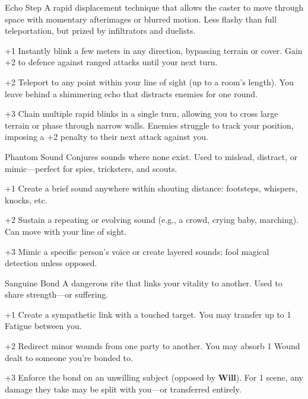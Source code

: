 \begin{WyrdSpell}[Translocation]{Echo Step}
    A rapid displacement technique that allows the caster to move through space with momentary afterimages or blurred motion. Less flashy than full teleportation, but prized by infiltrators and duelists.

    \begin{WyrdSpellBlock}
        \item[+1] Instantly blink a few meters in any direction, bypassing terrain or cover. Gain +2 to defence against ranged attacks until your next turn.
        \item[+2] Teleport to any point within your line of sight (up to a room’s length). You leave behind a shimmering echo that distracts enemies for one round.
        \item[+3] Chain multiple rapid blinks in a single turn, allowing you to cross large terrain or phase through narrow walls. Enemies struggle to track your position, imposing a +2 penalty to their next attack against you.
    \end{WyrdSpellBlock}
\end{WyrdSpell}

\begin{WyrdSpell}[Illusion]{Phantom Sound}
    Conjures sounds where none exist. Used to mislead, distract, or mimic—perfect for spies, tricksters, and scouts.

    \begin{WyrdSpellBlock}
        \item[+1] Create a brief sound anywhere within shouting distance: footsteps, whispers, knocks, etc.
        \item[+2] Sustain a repeating or evolving sound (e.g., a crowd, crying baby, marching). Can move with your line of sight.
        \item[+3] Mimic a specific person’s voice or create layered sounds; fool magical detection unless opposed.
    \end{WyrdSpellBlock}
\end{WyrdSpell}

\begin{WyrdSpell}[Blood]{Sanguine Bond}
    A dangerous rite that links your vitality to another. Used to share strength—or suffering.

    \begin{WyrdSpellBlock}
        \item[+1] Create a sympathetic link with a touched target. You may transfer up to 1 Fatigue between you.
        \item[+2] Redirect minor wounds from one party to another. You may absorb 1 Wound dealt to someone you’re bonded to.
        \item[+3] Enforce the bond on an unwilling subject (opposed by \textbf{Will}). For 1 scene, any damage they take may be split with you—or transferred entirely.
    \end{WyrdSpellBlock}
\end{WyrdSpell}

